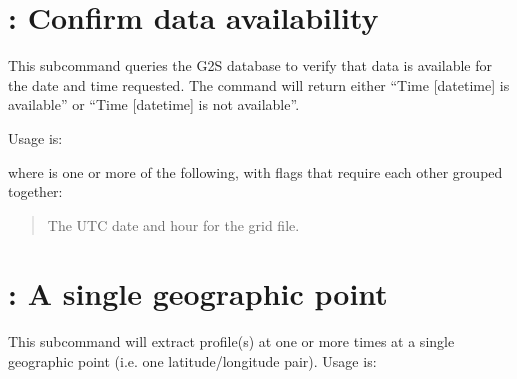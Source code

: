 \documentclass[letterpaper,10pt,english]{sphinxmanual}
\begin{document}
\section{: Confirm data availability}
\label{\detokenize{userguide:checktime-confirm-data-availability}}
\sphinxAtStartPar
This subcommand queries the G2S database to verify that data is available for the date and time requested.  The command will return either “Time {[}datetime{]} is available” or “Time {[}datetime{]} is not available”.

\sphinxAtStartPar
Usage is:

\sphinxAtStartPar
{}

\sphinxAtStartPar
where \sphinxcode{\sphinxupquote{{[}flags{]}}} is one or more of the following, with flags that require each other grouped together:

\sphinxAtStartPar
{}
\begin{quote}

\sphinxAtStartPar
The UTC date and hour for the grid file.
\end{quote}
\begin{description}
\item[{}] \leavevmode
\sphinxAtStartPar
{}

\sphinxAtStartPar
{}

\end{description}


\section{: A single geographic point}
\label{\detokenize{userguide:point-a-single-geographic-point}}
\sphinxAtStartPar
This subcommand will extract profile(s) at one or more times at a single geographic point (i.e. one latitude/longitude pair).  Usage is:
\end{document}
